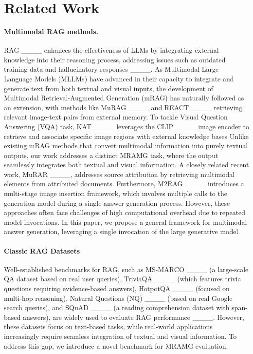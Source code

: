 \section{Related Work}
\label{sec:related_work}

\iffalse
\paragraph{Multimodal RAG methods.}
RAG ____ enhances the effectiveness of LLMs by integrating external knowledge into their reasoning process, addressing issues such as outdated training data and hallucinatory responses ____.
As Multimodal Large Language Models (MLLMs) have advanced in their capacity to integrate and generate text from both textual and visual inputs, the development of Multimodal Retrieval-Augmented Generation (mRAG) has naturally followed as an extension, with methods like MuRAG ____ and REACT ____ retrieving relevant image-text pairs from external memory.
To tackle Visual Question Answering (VQA) task, KAT ____ leverages the CLIP ____ image encoder to retrieve and associate specific image regions with external knowledge bases
Unlike existing mRAG methods that convert multimodal information into purely textual outputs, our work addresses a distinct MRAMG task, where the output seamlessly integrates both textual and visual information.
A closely related recent work, MuRAR ____, addresses source attribution by retrieving multimodal elements from attributed documents. Furthermore, M2RAG ____ introduces a multi-stage image insertion framework, which involves multiple calls to the generation model during a single answer generation process.
However, these approaches often face challenges of high computational overhead due to repeated model invocations. In this paper, we propose a general framework for multimodal answer generation, leveraging a single invocation of the large generative model.
\paragraph{Classic RAG Datasets}
Well-established benchmarks for RAG, such as MS-MARCO ____ (a large-scale QA dataset based on real user queries), TriviaQA ____ (which features trivia questions requiring evidence-based answers), HotpotQA ____ (focused on multi-hop reasoning), Natural Questions (NQ) ____ (based on real Google search queries), and SQuAD ____ (a reading comprehension dataset with span-based answers), are widely used to evaluate RAG performance ____. 
However, these datasets focus on text-based tasks, while real-world applications increasingly require seamless integration of textual and visual information. To address this gap, we introduce a novel benchmark for MRAMG evaluation.
